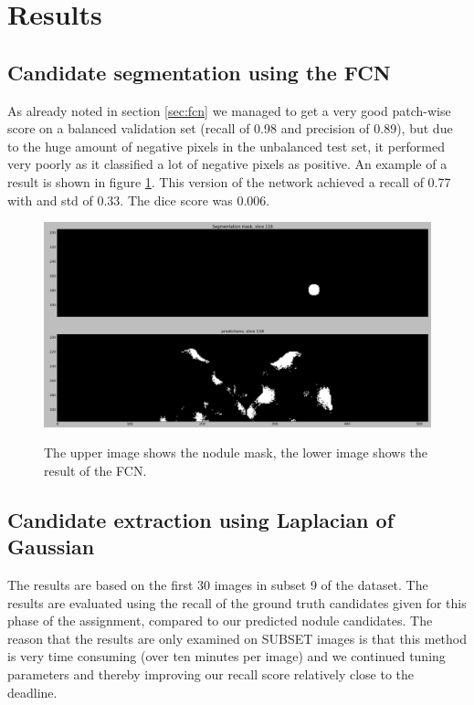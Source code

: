 \documentclass{article}
\begin{document}

\section{Results}\label{sec:results}
\subsection{Candidate segmentation using the FCN}
As already noted in section \ref{sec:fcn} we managed to get a very good patch-wise score on a balanced validation set (recall of 0.98 and precision of 0.89), but due to the huge amount of negative pixels in the unbalanced test set, it performed very poorly as it classified a lot of negative pixels as positive. An example of a result is shown in figure \ref{figure:nodules}. This version of the network achieved a recall of 0.77 with and std of 0.33. The dice score was 0.006. 

\begin{figure}[h]
	\centering
	{\includegraphics[width=0.7\linewidth]{./niet_zo_goed.png}}
	\caption{The upper image shows the nodule mask, the lower image shows the result of the FCN. \label{figure:nodules}}
\end{figure}

\subsection{Candidate extraction using Laplacian of Gaussian}
The results are based on the first 30 images in subset 9 of the dataset. The results are evaluated using the recall of the ground truth candidates given for this phase of the assignment, compared to our predicted nodule candidates. The reason that the results are only examined on SUBSET images is that this method is very time consuming (over ten minutes per image) and we continued tuning parameters and thereby improving our recall score relatively close to the deadline.
\end{document}
